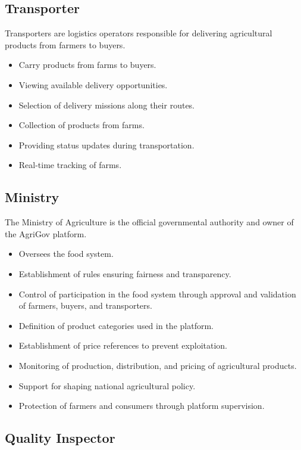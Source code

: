 \subsection{Transporter}

Transporters are logistics operators responsible for delivering agricultural products from farmers to buyers.

\begin{itemize}
	\item Carry products from farms to buyers.
	\item Viewing available delivery opportunities.
	\item Selection of delivery missions along their routes.
	\item Collection of products from farms.
	\item Providing status updates during transportation.
	\item Real-time tracking of farms.
\end{itemize}

\subsection{Ministry}

The Ministry of Agriculture is the official governmental authority and owner of the AgriGov platform.

\begin{itemize}
	\item Oversees the food system.
	\item Establishment of rules ensuring fairness and transparency.
	\item Control of participation in the food system through approval and validation of farmers, buyers, and transporters.
	\item Definition of product categories used in the platform.
	\item Establishment of price references to prevent exploitation.
	\item Monitoring of production, distribution, and pricing of agricultural products.
	\item Support for shaping national agricultural policy.
	\item Protection of farmers and consumers through platform supervision.
\end{itemize}

\subsection{Quality Inspector}

